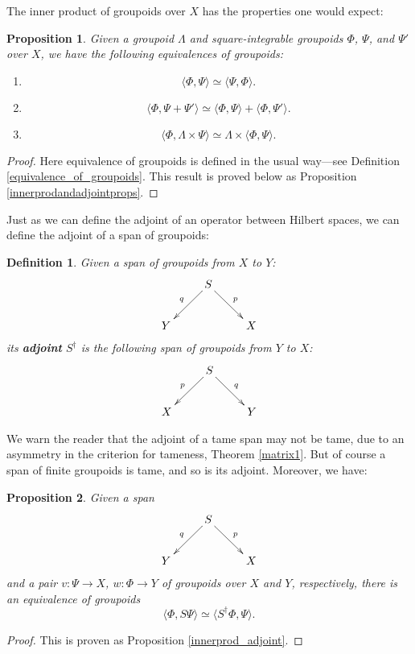 \documentclass{article}
\renewcommand{\to}{\rightarrow}
\newcommand{\maps}{\colon}
\newcommand{\ip}[2]{\langle #1,#2 \rangle}
\newtheorem{definition}[thm]{Definition}
\newtheorem*{proposition*}{Proposition}
\begin{document}
The inner product of groupoids over $X$ has the properties one 
would expect:
\begin{proposition*}
Given a groupoid $\Lambda$ and square-integrable
groupoids $\Phi$, $\Psi$, and $\Psi'$ over $X$, we have the
following equivalences of groupoids:
\begin{enumerate}
\item
\[\ip{\Phi}{\Psi} \simeq \ip{\Psi}{\Phi}.\] 
\item
\[\ip{\Phi}{\Psi + \Psi'} \simeq \ip{\Phi}{\Psi} + \ip{\Phi}{\Psi'}.\] 
\item
\[\ip{\Phi}{\Lambda \times \Psi} \simeq \Lambda \times \ip{\Phi}{\Psi}.\]
\end{enumerate}
\end{proposition*}
\begin{proof} Here equivalence of groupoids is defined in the usual
way---see Definition \ref{equivalence_of_groupoids}.  This result is
proved below as Proposition
\ref{innerprodandadjointprops}. \end{proof}

Just as we can define the adjoint of an operator between
Hilbert spaces, we can define the adjoint of a span of groupoids:

\begin{definition}
Given a span of groupoids from $X$ to $Y$:
\[
\xymatrix{
& S\ar[dl]_{q} \ar[dr]^{p} & \\
Y & & X
}
\]
its {\bf adjoint} $S^{\dagger}$ is the following span of
groupoids from $Y$ to $X$:
\[
\xymatrix{
& S\ar[dl]_{p} \ar[dr]^{q} & \\
X & & Y
}
\]
\end{definition}

We warn the reader that the adjoint of a tame span may not be tame,
due to an asymmetry in the criterion for tameness, Theorem
\ref{matrix1}.  But of course a span of finite groupoids is tame, and
so is its adjoint.  Moreover, we have:

\begin{proposition*}
Given a span
\[
\xymatrix{
& S \ar[dl]_{q} \ar[dr]^{p} & \\
Y & & X
}
\]
and a pair $v \maps \Psi \to X$, $w \maps \Phi \to Y$ of groupoids
over $X$ and $Y$, respectively, there is an equivalence of groupoids
\[ \langle \Phi,S\Psi \rangle 
\simeq \langle S^\dagger\Phi,\Psi \rangle. \]
\end{proposition*}

\begin{proof} 
This is proven as Proposition \ref{innerprod_adjoint}.
\end{proof}
\end{document}
